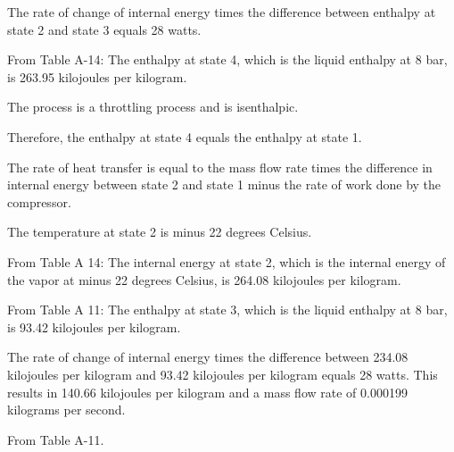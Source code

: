 The rate of change of internal energy times the difference between enthalpy at state 2 and state 3 equals 28 watts.

From Table A-14:
The enthalpy at state 4, which is the liquid enthalpy at 8 bar, is 263.95 kilojoules per kilogram.

The process is a throttling process and is isenthalpic.

Therefore, the enthalpy at state 4 equals the enthalpy at state 1.

The rate of heat transfer is equal to the mass flow rate times the difference in internal energy between state 2 and state 1 minus the rate of work done by the compressor.

The temperature at state 2 is minus 22 degrees Celsius.

From Table A 14:
The internal energy at state 2, which is the internal energy of the vapor at minus 22 degrees Celsius, is 264.08 kilojoules per kilogram.

From Table A 11:
The enthalpy at state 3, which is the liquid enthalpy at 8 bar, is 93.42 kilojoules per kilogram.

The rate of change of internal energy times the difference between 234.08 kilojoules per kilogram and 93.42 kilojoules per kilogram equals 28 watts.
This results in 140.66 kilojoules per kilogram and a mass flow rate of 0.000199 kilograms per second.

From Table A-11.
